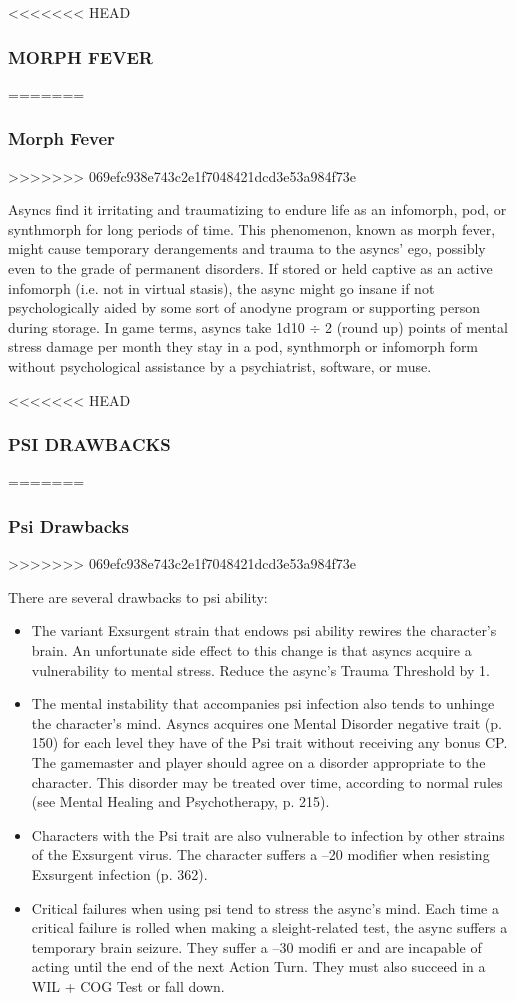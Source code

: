 <<<<<<< HEAD
\subsubsection{MORPH FEVER}
=======
\subsubsection{Morph Fever}
>>>>>>> 069efc938e743c2e1f7048421dcd3e53a984f73e

Asyncs find it irritating and traumatizing to endure life
as an infomorph, pod, or synthmorph for long periods
of time. This phenomenon, known as morph fever,
might cause temporary derangements and trauma to
the asyncs’ ego, possibly even to the grade of permanent
disorders. If stored or held captive as an active
infomorph (i.e. not in virtual stasis), the async might
go insane if not psychologically aided by some sort of
anodyne program or supporting person during storage.
In game terms, asyncs take 1d10 $\div$ 2 (round up)
points of mental stress damage per month they stay
in a pod, synthmorph or infomorph form without
psychological assistance by a psychiatrist, software,
or muse.

<<<<<<< HEAD
\subsubsection{PSI DRAWBACKS}
=======
\subsubsection{Psi Drawbacks}
>>>>>>> 069efc938e743c2e1f7048421dcd3e53a984f73e

There are several drawbacks to psi ability:

\begin{itemize}
\item The variant Exsurgent strain that endows psi ability
rewires the character’s brain. An unfortunate side
effect to this change is that asyncs acquire a vulnerability
to mental stress. Reduce the async’s Trauma
Threshold by 1.
\item The mental instability that accompanies psi infection
also tends to unhinge the character’s mind.
Asyncs acquires one Mental Disorder negative trait
(p. 150) for each level they have of the Psi trait
without receiving any bonus CP. The gamemaster
and player should agree on a disorder appropriate
to the character. This disorder may be treated over
time, according to normal rules (see Mental Healing
and Psychotherapy, p. 215).
\item Characters with the Psi trait are also vulnerable to
infection by other strains of the Exsurgent virus.
The character suffers a –20 modifier when resisting
Exsurgent infection (p. 362).
\item Critical failures when using psi tend to stress the
async’s mind. Each time a critical failure is rolled
when making a sleight-related test, the async suffers
a temporary brain seizure. They suffer a –30 modifi
er and are incapable of acting until the end of the
next Action Turn. They must also succeed in a WIL
+ COG Test or fall down.
\end{itemize}

